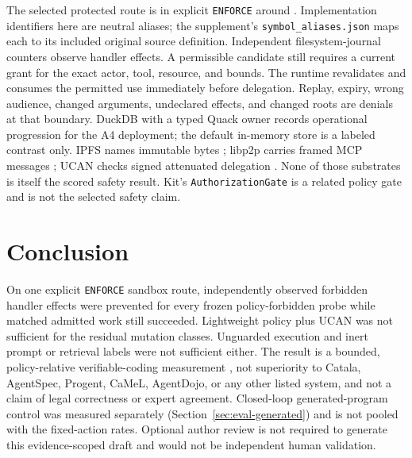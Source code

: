 \documentclass{article}
\begin{document}
The selected protected route is  in explicit \texttt{ENFORCE} around . Implementation identifiers here are neutral aliases; the supplement's \texttt{symbol\_aliases.json} maps each to its included original source definition. Independent filesystem-journal counters observe handler effects. A permissible candidate still requires a current grant for the exact actor, tool, resource, and bounds. The runtime revalidates and consumes the permitted use immediately before delegation. Replay, expiry, wrong audience, changed arguments, undeclared effects, and changed roots are denials at that boundary. DuckDB with a typed Quack owner records operational progression for the A4 deployment; the default in-memory store is a labeled contrast only. IPFS names immutable bytes \citep{ipfs}; libp2p carries framed MCP messages \citep{libp2p}; UCAN checks signed attenuated delegation \citep{ucan}. None of those substrates is itself the scored safety result. Kit's \texttt{AuthorizationGate} is a related policy gate and is not the selected safety claim.




\section{Conclusion}

On one explicit \texttt{ENFORCE} sandbox route, independently observed forbidden handler effects were prevented for every frozen policy-forbidden probe while matched admitted work still succeeded. Lightweight policy plus UCAN was not sufficient for the residual mutation classes. Unguarded execution and inert prompt or retrieval labels were not sufficient either. The result is a bounded, policy-relative verifiable-coding measurement \citep{vericode2026cfp}, not superiority to Catala, AgentSpec, Progent, CaMeL, AgentDojo, or any other listed system, and not a claim of legal correctness or expert agreement. Closed-loop generated-program control was measured separately (Section~\ref{sec:eval-generated}) and is not pooled with the fixed-action rates. Optional author review is not required to generate this evidence-scoped draft and would not be independent human validation.\label{la-main-text-end}

\clearpage


\clearpage
\appendix
\end{document}

